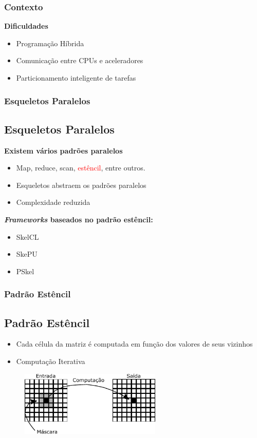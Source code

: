 \documentclass[xcolor={table}]{beamer}
\newcommand{\Fws}{\textit{Frameworks}\xspace}
\begin{document}
\begin{frame}\frametitle{Contexto}
    \textbf{Dificuldades}
    \begin{itemize}
        \item {Programação Híbrida}
        \item {Comunicação entre CPUs e aceleradores}
        \item {Particionamento inteligente de tarefas}
    \end{itemize}
    \vfill
\end{frame}

\begin{frame}\frametitle{Esqueletos Paralelos}
    \subsection{Esqueletos Paralelos}
    \textbf{Existem vários padrões paralelos ~\cite{mccool10}}
    \begin{itemize}
        \item {Map, reduce, scan, \textcolor{red}{estêncil}, entre outros.}
    \end{itemize}
    \begin{itemize}
        \item{Esqueletos abstraem os padrões paralelos}
        \item{Complexidade reduzida}
    \end{itemize}
    \textbf{\Fws baseados no padrão estêncil:}
    \begin{itemize}
        \item SkelCL ~\cite{steuwer11}
        \item SkePU ~\cite{enmyren10}
        \item PSkel ~\cite{pereira15}
    \end{itemize}
\end{frame}


\begin{frame}\frametitle{Padrão Estêncil}
    \subsection{Padrão Estêncil}
    \begin{itemize}
        \item {Cada célula da matriz é computada em função dos valores de seus vizinhos}
        \item {Computação Iterativa}
    \end{itemize}
    \begin{figure}
        \includegraphics[width=0.6\textwidth]{26}
    \end{figure}
\end{frame}
\end{document}
